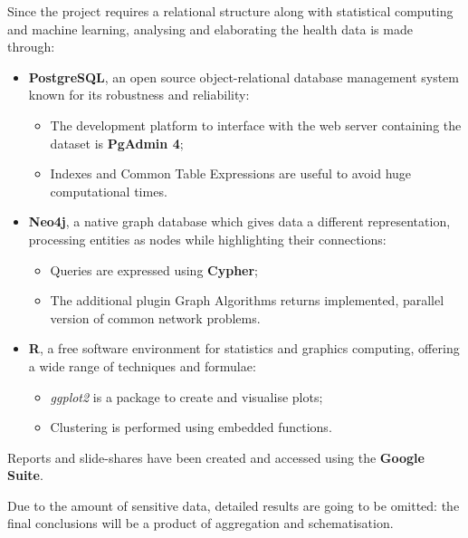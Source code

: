 Since the project requires a relational structure along with statistical computing and machine learning, analysing and elaborating the health data is made through:
\begin{itemize}
	\item \textbf{PostgreSQL}\cite{pg}, an open source object-relational database management system known for its robustness and reliability:
	\begin{itemize}
		\item The development platform to interface with the web server containing the dataset is \textbf{PgAdmin 4};
		\item Indexes and Common Table Expressions are useful to avoid huge computational times.
	\end{itemize}
	\item \textbf{Neo4j}\cite{neo}, a native graph database which gives data a different representation, processing entities as nodes while highlighting their connections:
	\begin{itemize}
		\item Queries are expressed using \textbf{Cypher};
		\item The additional plugin Graph Algorithms returns implemented, parallel version of common network problems. 
	\end{itemize}
	\item \textbf{R}\cite{r}, a free software environment for statistics and graphics computing, offering a wide range of techniques and formulae:
	\begin{itemize}
		\item \textit{ggplot2} is a package to create and visualise plots;
		\item Clustering is performed using embedded functions.
	\end{itemize}
\end{itemize}

Reports and slide-shares have been created and accessed using the \textbf{Google Suite}.

Due to the amount of sensitive data, detailed results are going to be omitted: the final conclusions will be a product of aggregation and schematisation.
